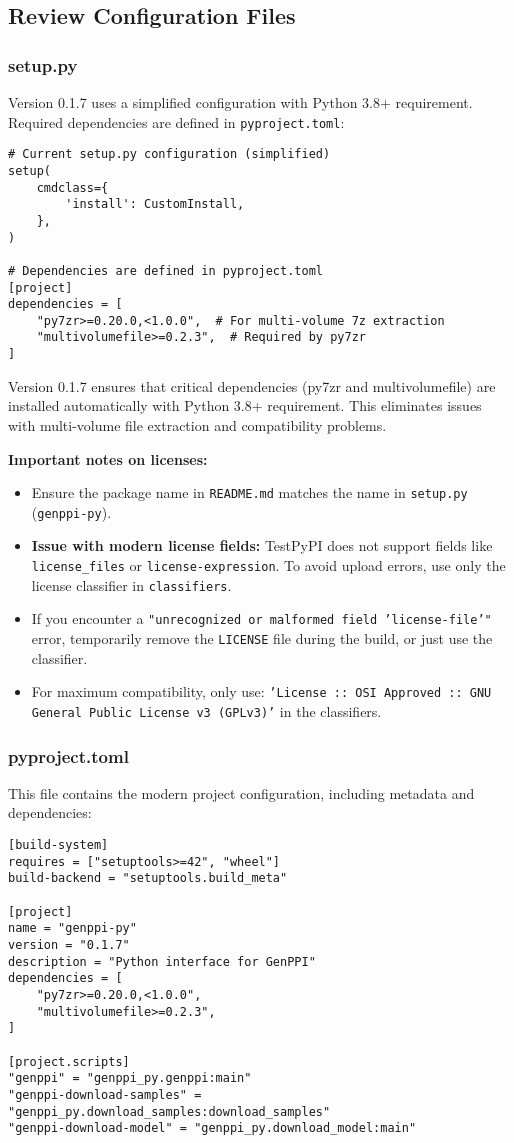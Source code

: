 \documentclass[11pt, a4paper]{article}
\begin{document}
\subsection{Review Configuration Files}
\subsubsection{setup.py}
Version 0.1.7 uses a simplified configuration with Python 3.8+ requirement. Required dependencies are defined in \texttt{pyproject.toml}:
\begin{lstlisting}[style=pythonstyle]
# Current setup.py configuration (simplified)
setup(
    cmdclass={
        'install': CustomInstall,
    },
)

# Dependencies are defined in pyproject.toml
[project]
dependencies = [
    "py7zr>=0.20.0,<1.0.0",  # For multi-volume 7z extraction
    "multivolumefile>=0.2.3",  # Required by py7zr
]
\end{lstlisting}
Version 0.1.7 ensures that critical dependencies (py7zr and multivolumefile) are installed automatically with Python 3.8+ requirement. This eliminates issues with multi-volume file extraction and compatibility problems.

\textbf{Important notes on licenses:} 
\begin{itemize}
    \item Ensure the package name in \texttt{README.md} matches the name in \texttt{setup.py} (\texttt{genppi-py}).
    \item \textbf{Issue with modern license fields:} TestPyPI does not support fields like \texttt{license\_files} or \texttt{license-expression}. To avoid upload errors, use only the license classifier in \texttt{classifiers}.
    \item If you encounter a \texttt{"unrecognized or malformed field 'license-file'"} error, temporarily remove the \texttt{LICENSE} file during the build, or just use the classifier.
    \item For maximum compatibility, only use: \texttt{'License :: OSI Approved :: GNU General Public License v3 (GPLv3)'} in the classifiers.
\end{itemize}

\subsubsection{pyproject.toml}
This file contains the modern project configuration, including metadata and dependencies:
\begin{lstlisting}[style=bashstyle]
[build-system]
requires = ["setuptools>=42", "wheel"]
build-backend = "setuptools.build_meta"

[project]
name = "genppi-py"
version = "0.1.7"
description = "Python interface for GenPPI"
dependencies = [
    "py7zr>=0.20.0,<1.0.0",
    "multivolumefile>=0.2.3",
]

[project.scripts]
"genppi" = "genppi_py.genppi:main"
"genppi-download-samples" = "genppi_py.download_samples:download_samples"
"genppi-download-model" = "genppi_py.download_model:main"
\end{lstlisting}
\end{document}
